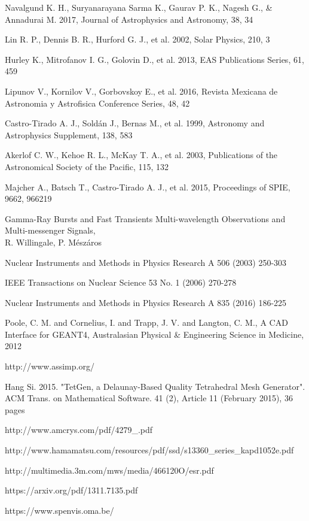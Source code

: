 \documentclass[12pt, a4paper,titlepage]{article}
\numberwithin{equation}{section}
\numberwithin{figure}{section}
\begin{document}
\begin{thebibliography}{99}
 Navalgund K. H., Suryanarayana Sarma K., Gaurav P. K., Nagesh G., \& Annadurai M. 2017, Journal of Astrophysics and Astronomy, 38, 34

 Lin R. P., Dennis B. R., Hurford G. J., et al. 2002, Solar Physics, 210, 3

 Hurley K., Mitrofanov I. G., Golovin D., et al. 2013, EAS Publications Series, 61, 459 

 Lipunov V., Kornilov V., Gorbovskoy E., et al. 2016, Revista Mexicana de Astronomia y Astrofisica
Conference Series, 48, 42

 Castro-Tirado A. J., Soldán J., Bernas M., et al. 1999, Astronomy and Astrophysics Supplement, 138, 583

 Akerlof C. W., Kehoe R. L., McKay T. A., et al. 2003, Publications of the Astronomical Society of the Pacific, 115, 132

 Majcher A., Batsch T., Castro-Tirado A. J., et al. 2015, Proceedings of SPIE, 9662, 966219

 Gamma-Ray Bursts and Fast Transients
Multi-wavelength Observations and Multi-messenger Signals,\\
R. Willingale, P. Mészáros

 Nuclear Instruments and Methods in Physics Research A 506 (2003) 250-303

 IEEE Transactions on Nuclear Science 53 No. 1 (2006) 270-278

 Nuclear Instruments and Methods in Physics Research A 835 (2016) 186-225

 Poole, C. M. and Cornelius, I. and Trapp, J. V. and Langton, C. M., A CAD Interface for GEANT4, Australasian Physical \& Engineering Science in Medicine, 2012

 http://www.assimp.org/

 Hang Si. 2015. "TetGen, a Delaunay-Based Quality Tetrahedral Mesh Generator". ACM Trans. on Mathematical Software. 41 (2), Article 11 (February 2015), 36 pages

 http://www.amcrys.com/pdf/4279\_.pdf

 http://www.hamamatsu.com/resources/pdf/ssd/s13360\_series\_kapd1052e.pdf

 http://multimedia.3m.com/mws/media/466120O/esr.pdf
 
 https://arxiv.org/pdf/1311.7135.pdf
 
 
 https://www.spenvis.oma.be/

\end{thebibliography}

\pagebreak

\listoffigures


\end{document}
